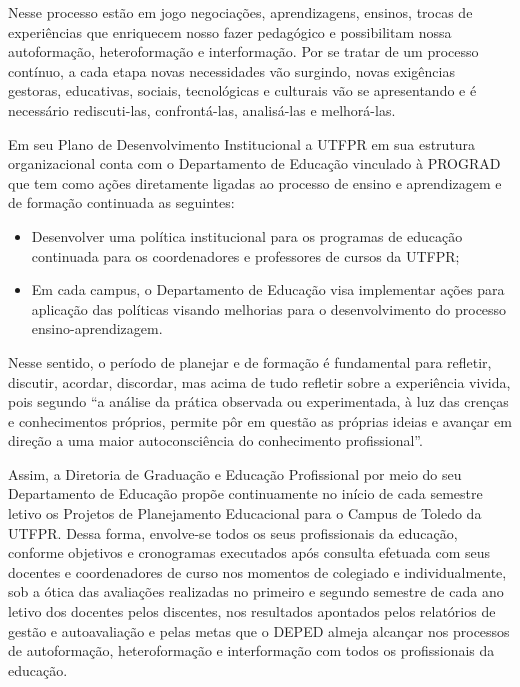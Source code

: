 Nesse processo estão em jogo negociações, aprendizagens, ensinos, trocas de experiências que enriquecem nosso fazer pedagógico e possibilitam nossa autoformação, heteroformação e interformação. Por se tratar de um processo contínuo, a cada etapa novas necessidades vão surgindo, novas exigências gestoras, educativas, sociais, tecnológicas e culturais vão se apresentando e é necessário rediscuti-las, confrontá-las, analisá-las e melhorá-las.

Em seu Plano de Desenvolvimento Institucional \cite{pdiutfpr} a UTFPR em sua estrutura organizacional conta com o Departamento de Educação vinculado à PROGRAD que tem como ações diretamente ligadas ao processo de ensino e aprendizagem e de formação continuada as seguintes:

\begin{itemize}
    \item Desenvolver uma política institucional para os programas de educação continuada para os coordenadores e professores de cursos da UTFPR;
    \item Em cada campus, o Departamento de Educação visa implementar ações para aplicação das políticas visando melhorias para o desenvolvimento do processo ensino-aprendizagem.
\end{itemize}

Nesse sentido, o período de planejar e de formação é fundamental para refletir, discutir, acordar, discordar, mas acima de tudo refletir sobre a experiência vivida, pois segundo  \cite[p. 41]{vaillant2012ensinando} ``a análise da prática observada ou experimentada, à luz das crenças e conhecimentos próprios, permite pôr em questão as próprias ideias e avançar em direção a uma maior autoconsciência do conhecimento profissional''.

Assim, a Diretoria de Graduação e Educação Profissional por meio do seu Departamento de Educação propõe continuamente no início de cada semestre letivo os Projetos de Planejamento Educacional para o Campus de Toledo da UTFPR. Dessa forma, envolve-se todos os seus profissionais da educação, conforme objetivos e cronogramas executados após consulta efetuada com seus docentes e coordenadores de curso nos momentos de colegiado e individualmente, sob a ótica das avaliações realizadas no primeiro e segundo semestre de cada ano letivo dos docentes pelos discentes, nos resultados apontados pelos relatórios de gestão e autoavaliação e pelas metas que o DEPED almeja alcançar nos processos de autoformação, heteroformação e interformação com todos os profissionais da educação.

